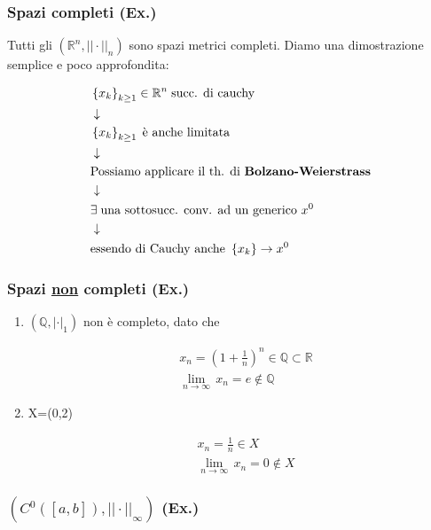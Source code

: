 \subsubsection{Spazi completi (Ex.)}

Tutti gli $(\mathbb{R}^n, ||\cdot||_n)$ sono spazi metrici completi. Diamo una dimostrazione semplice e poco approfondita:

\begin{align}
{}&\left\{ x_k \right\}_{k\geq 1} \in \mathbb{R}^n \; \text{succ. di cauchy} \nonumber \\
& \downarrow \nonumber \\
& \left\{ x_k \right\}_{k\geq 1} \; \text{è anche limitata} \nonumber \\
& \downarrow \nonumber \\
& \text{Possiamo applicare il th. di \textbf{Bolzano-Weierstrass}} \nonumber \\
& \downarrow \nonumber \\
& \exists \; \text{una sottosucc. conv. ad un generico } x^0 \nonumber \\
& \downarrow \nonumber \\
& \text{essendo di Cauchy anche } \left\{ x_k \right\} \rightarrow x^0 \nonumber
\end{align}

\subsubsection{Spazi \underline{non}  completi  (Ex.)}

\begin{enumerate}
	\item $(\mathbb{Q}, |\cdot|_1)$ non è completo, dato che 
	
	\begin{align}
	{}&x_n=\left(
	1+\frac{1}{n}
	\right)^n \in \mathbb{Q} \subset \mathbb{R} \\
	&\underset{n \rightarrow \infty}{\lim} \, x_n= e \notin \mathbb{Q}
	\end{align}
	
	\item X=(0,2)
	
	\begin{align}
	{}&x_n= \frac{1}{n} \in X \\
	& \underset{n \rightarrow \infty}{\lim} \, x_n = 0 \notin X
	\end{align}
\end{enumerate}

\subsubsection{$(C^0([a,b]), ||\cdot||_\infty)$  (Ex.)}

